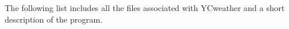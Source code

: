 The following list includes all the files associated with YCweather and a short description of the program.\par

